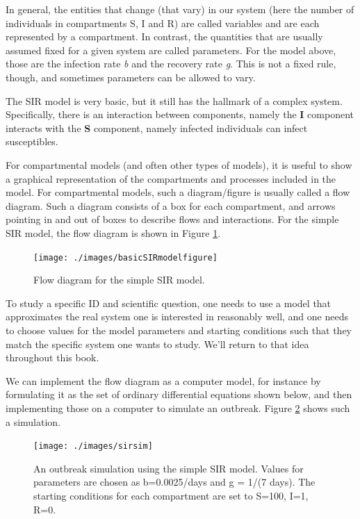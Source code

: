 \documentclass[
]{book}
\begin{document}
In general, the entities that change (that vary) in our system (here the number of individuals in compartments S, I and R) are called variables and are each represented by a compartment. In contrast, the quantities that are usually assumed fixed for a given system are called parameters. For the model above, those are the infection rate \emph{b} and the recovery rate \emph{g}. This is not a fixed rule, though, and sometimes parameters can be allowed to vary.

The SIR model is very basic, but it still has the hallmark of a complex system. Specifically, there is an interaction between components, namely the \textbf{I} component interacts with the \textbf{S} component, namely infected individuals can infect susceptibles.

For compartmental models (and often other types of models), it is useful to show a graphical representation of the compartments and processes included in the model. For compartmental models, such a diagram/figure is usually called a flow diagram. Such a diagram consists of a box for each compartment, and arrows pointing in and out of boxes to describe flows and interactions. For the simple SIR model, the flow diagram is shown in Figure \ref{fig:basicSIR}.

\begin{figure}
\texttt{[image: ./images/basicSIRmodelfigure]} \caption{Flow diagram for the simple SIR model.}\label{fig:basicSIR}
\end{figure}

To study a specific ID and scientific question, one needs to use a model that approximates the real system one is interested in reasonably well, and one needs to choose values for the model parameters and starting conditions such that they match the specific system one wants to study. We'll return to that idea throughout this book.

We can implement the flow diagram as a computer model, for instance by formulating it as the set of ordinary differential equations shown below, and then implementing those on a computer to simulate an outbreak. Figure \ref{fig:sirsim} shows such a simulation.

\begin{figure}
\texttt{[image: ./images/sirsim]} \caption{An outbreak simulation using the simple SIR model. Values for parameters are chosen as b=0.0025/days and g = 1/(7 days). The starting conditions for each compartment are set to S=100, I=1, R=0.}\label{fig:sirsim}
\end{figure}
\end{document}
